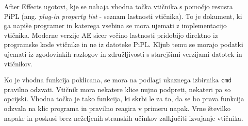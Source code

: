 \documentclass[a4paper, 12pt]{book}
\begin{document}
After Effects ugotovi, kje se nahaja vhodna točka vtičnika s pomočjo resusra PiPL (ang. {\it plug-in property list} - seznam lastnosti vtičnika).
To je dokument, ki ga napiše programer in katerega vsebina se mora ujemati z implementacijo vtičnika. 
Moderne verzije AE sicer večino lastnosti pridobijo direktno iz programske kode vtičnike in ne iz datoteke PiPL. 
Kljub temu se morajo podatki ujemati iz zgodovinkih razlogov in združljivosti s starejšimi verzijami datotek in vtičnikov. 

Ko je vhodna funkcija poklicana, se mora na podlagi ukaznega izbirnika \texttt{cmd} pravilno odzvati. 
Vtičnik mora nekatere klice nujno podpreti, nekateri pa so opcijski. 
Vhodna točka je tako funkcija, ki skrbi le za to, da se bo prava funkcija odzvala na klic programa in pravilno reagira v primeru napak. 
Vrne številko napake in poskusi brez neželjenih stranskih učinkov zalkjučiti izvajanje vtičnika.
\end{document}

